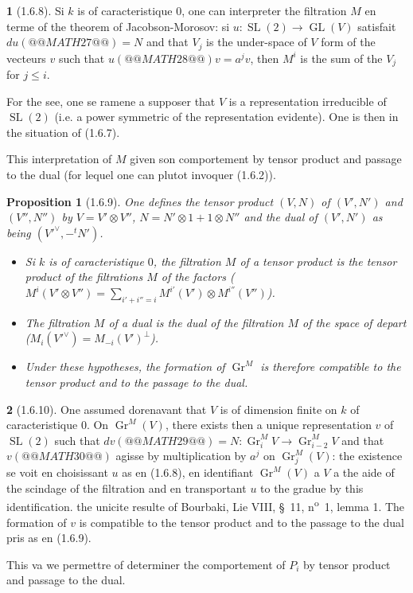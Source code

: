 \documentclass[12pt,a4paper]{article}
\theoremstyle{plain}
\newtheorem{proposition}[theorem]{Proposition}
\theoremstyle{definition}
\theoremstyle{definition}
\newtheorem{para}{}[section]
\theoremstyle{remark}
\DeclareMathOperator{\GL}{GL}
\DeclareMathOperator{\Gr}{Gr}
\DeclareMathOperator{\SL}{SL}
\begin{document}
\begin{para}[1.6.8]
Si $k$ is of caracteristique $0$, one can interpreter the filtration $M$ en terme of the theorem of Jacobson-Morosov: si $u: \SL(2) \to \GL(V)$ satisfait $du(@@MATH27@@) = N$ and that $V_j$ is the under-space of $V$ form of the vecteurs $v$ such that $u(@@MATH28@@) v = a^j v$, then $M^i$ is the sum of the $V_j$ for $j \leq i$.

For the see, one se ramene a supposer that $V$ is a representation irreducible of $\SL(2)$ (i.e. a power symmetric of the representation evidente). One is then in the situation of (1.6.7).

This interpretation of $M$ given son comportement by tensor product and passage to the dual (for lequel one can plutot invoquer (1.6.2)).
\end{para}

\begin{proposition}[1.6.9]
One defines the tensor product $(V, N)$ of $(V', N')$ and $(V'', N'')$ by $V = V' \otimes V''$, $N = N' \otimes 1 + 1 \otimes N''$ and the dual of $(V', N')$ as being $(V'^\vee, -^tN')$.
\begin{itemize}[nosep]
\item[(i)] Si $k$ is of caracteristique $0$, the filtration $M$ of a tensor product is the tensor product of the filtrations $M$ of the factors ($M^i(V' \otimes V'') = \sum_{i'+i''=i} M^{i'}(V') \otimes M^{i''}(V'')$).
\item[(ii)] The filtration $M$ of a dual is the dual of the filtration $M$ of the space of depart ($M_i(V'^\vee) = M_{-i}(V')^\perp$).
\item[(iii)] Under these hypotheses, the formation of $\Gr^M$ is therefore compatible to the tensor product and to the passage to the dual.
\end{itemize}
\end{proposition}

\begin{para}[1.6.10]
One assumed dorenavant that $V$ is of dimension finite on $k$ of caracteristique $0$. On $\Gr^M(V)$, there exists then a unique representation $v$ of $\SL(2)$ such that $dv(@@MATH29@@) = N: \Gr_i^M V \to \Gr_{i-2}^M V$ and that $v(@@MATH30@@)$ agisse by multiplication by $a^j$ on $\Gr_j^M(V)$: the existence se voit en choisissant $u$ as en (1.6.8), en identifiant $\Gr^M(V)$ a $V$ a the aide of the scindage of the filtration and en transportant $u$ to the gradue by this identification. the unicite resulte of Bourbaki, Lie VIII, \S~11, n\textsuperscript{o}~1, lemma 1. The formation of $v$ is compatible to the tensor product and to the passage to the dual pris as en (1.6.9).

This va we permettre of determiner the comportement of $P_i$ by tensor product and passage to the dual.
\end{para}
\end{document}
